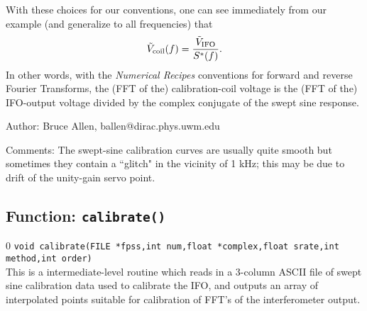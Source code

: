 With these choices for our conventions, one can see immediately from our
example (and generalize to all frequencies) that
\begin{equation}
\label{e:coilcon}
{\tilde V}_{\rm coil}(f) = {{\tilde V}_{\rm IFO} \over S^*(f)}.
\end{equation}
In other words, with the {\it Numerical Recipes} \cite{NumRec}
conventions for forward and reverse Fourier Transforms, the (FFT of
the) calibration-coil voltage is  the (FFT of the) IFO-output
voltage divided by the complex conjugate of the swept sine response.
\begin{description}
\item{Author:}  Bruce Allen, ballen@dirac.phys.uwm.edu
\item{Comments:}  The swept-sine calibration curves are usually quite
smooth but sometimes they contain a ``glitch" in the vicinity of
1 kHz; this may be due to drift of the unity-gain servo point.
\end{description}
\clearpage

\subsection{Function: {\tt calibrate()}}
\setcounter{equation}0
{\tt void calibrate(FILE *fpss,int num,float *complex,float srate,int
method,int order) }\\
This is a intermediate-level routine which reads in a 3-column ASCII
file of swept sine calibration data used to calibrate the IFO, and
outputs an array of interpolated points suitable for calibration of
FFT's of the interferometer output.

